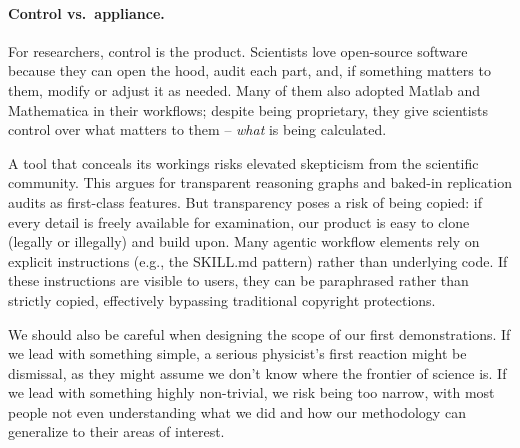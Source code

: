 \paragraph{Control vs.\ appliance.}
For researchers, control is the product. Scientists love open-source software because they can open the hood, audit each part, and, if something matters to them, modify or adjust it as needed. Many of them also adopted Matlab and Mathematica in their workflows; despite being proprietary, they give scientists control over what matters to them -- \emph{what} is being calculated.

A tool that conceals its workings risks elevated skepticism from the scientific community. This argues for transparent reasoning graphs and baked-in replication audits as first-class features. But transparency poses a risk of being copied: if every detail is freely available for examination, our product is easy to clone (legally or illegally) and build upon. Many agentic workflow elements rely on explicit instructions (e.g., the SKILL.md pattern) rather than underlying code. If these instructions are visible to users, they can be paraphrased rather than strictly copied, effectively bypassing traditional copyright protections.

We should also be careful when designing the scope of our first demonstrations. If we lead with something simple, a serious physicist's first reaction might be dismissal, as they might assume we don't know where the frontier of science is. If we lead with something highly non-trivial, we risk being too narrow, with most people not even understanding what we did and how our methodology can generalize to their areas of interest.

